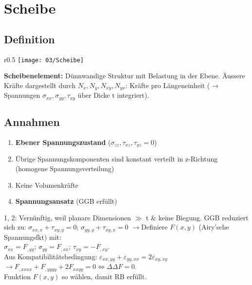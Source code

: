 \section{Scheibe}
    \subsection{Definition}
        \begin{wrapfigure}[7]{r}{0.5\linewidth}
            \vspace{-3mm}
            \texttt{[image: 03/Scheibe]}
        \end{wrapfigure}
        \textbf{Scheibenelement:} Dünnwandige Struktur mit Belastung in der Ebene. Äussere Kräfte dargestellt durch $N_x,N_y,N_{xy},N_{yx}$: Kräfte pro Längeneinheit ($\rightarrow$ Spannungen $\sigma_{xx},\sigma_{yy},\tau_{xy}$ über Dicke t integriert).
    
    \subsection{Annahmen}
        \begin{enumerate}[noitemsep]
            \item \textbf{Ebener Spannungszustand} ($\sigma_{zz},\tau_{xz},\tau_{yz}=0$)
            \item Übrige Spannungskomponenten sind konstant verteilt in z-Richtung (homogene Spannungsverteilung)
            \item Keine Volumenkräfte
            \item \textbf{Spannungsansatz} (GGB erfüllt)
        \end{enumerate}
        1, 2: Vernünftig, weil planare Dimensionen $\gg$ t \& keine Biegung. GGB reduziert sich zu: $\displaystyle\sigma_{xx,x} + \tau_{xy,y}=0$; $\sigma_{yy,y} + \tau_{xy,x}=0$
        $\rightarrow$Definiere $F(x,y)$ (Airy'sche Spannungsfkt) mit:\\ $\sigma_{xx}=F_{,yy}$; $\sigma_{yy}=F_{,xx}$; $\tau_{xy}=-F_{,xy}$. 
        \\Aus Kompatibilitätsbedingung: $\varepsilon_{xx,yy}+\varepsilon_{yy,xx}=2\varepsilon_{xy,xy}$ \\$\rightarrow F_{,xxxx}+F_{,yyyy}+2F_{xxyy}=0 \Leftrightarrow\Delta\Delta F=0$.
        \\Funktion $F(x,y)$ so wählen, damit RB erfüllt.
